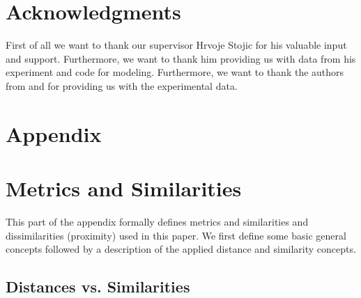 \documentclass[12pt,a4paper,bibliography=totocnumbered,listof=totocnumbered]{scrartcl}
\begin{document}
{\section{Acknowledgments}

First of all we want to thank our supervisor Hrvoje Stojic for his valuable input and support. Furthermore, we want to thank him providing us with data from his experiment and code for modeling. Furthermore, we want to thank the authors from \cite{Stout2004} and  \cite{Yechiam2008} for providing us with the experimental data. 


\pagebreak

\renewcommand\refname{List of Literature}






\pagebreak

\rhead{}
\setcounter{page}{1}

\begin{appendix}
	
\section*{Appendix}
{}

\section{Metrics and Similarities}

This part of the appendix formally defines metrics and similarities and dissimilarities (proximity) used in this paper. We first define some basic general concepts followed by a description of the applied distance and similarity concepts. 

\subsection{Distances vs. Similarities}


\end{appendix}}
\end{document}
